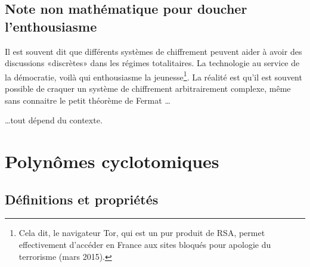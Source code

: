 \subsection{Note non mathématique pour doucher l'enthousiasme}

Il est souvent dit\cite{ooTODUooAhFHQk} que différents systèmes de chiffrement peuvent aider à avoir des discussions «discrètes» dans les régimes totalitaires. La technologie au service de la démocratie, voilà qui enthousiasme la jeunesse\footnote{Cela dit, le navigateur Tor\cite{ooHBLCooYtBBfx}, qui est un pur produit de RSA, permet effectivement d'accéder en France aux sites bloqués pour apologie du terrorisme (mars 2015).}. La réalité est qu'il est souvent possible de craquer un système de chiffrement arbitrairement complexe, même sans connaitre le petit théorème de Fermat \ldots


\noindent \ldots tout dépend du contexte.

\section{Polynômes cyclotomiques}

\subsection{Définitions et propriétés}

